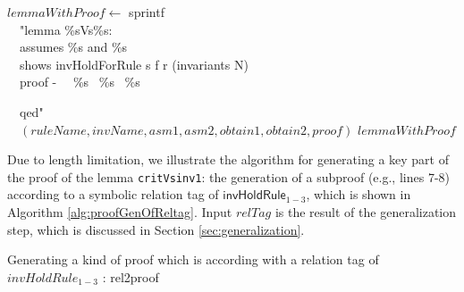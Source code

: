 \documentclass[final]{IEEEtran}
\def \twoSpaces {\ \ }
\begin{document}
{\begin{algorithm}
{$lemmaWithProof \leftarrow$ sprintf \\
\twoSpaces"lemma \%sVs\%s:\\
\twoSpaces assumes \%s and \%s\\
\twoSpaces  shows  invHoldForRule s f r (invariants   N)\\
\twoSpaces  proof -
\twoSpaces \%s~ \%s~  \%s

\twoSpaces qed"\\

\twoSpaces $(ruleName, invName, asm1,asm2, obtain1, obtain2, proof)$ \;
    \Return $lemmaWithProof$
}



\end{algorithm}




Due to length limitation, we illustrate the algorithm  for generating  a key part of the proof of the lemma {\tt critVsinv1}: the generation of a subproof (e.g., lines 7-8) according to a symbolic  relation tag of $\mathsf{invHoldRule}_{1-3}$, which is shown in Algorithm \ref{alg:proofGenOfReltag}. Input $relTag$ is the result of the   generalization step, which is discussed in Section \ref{sec:generalization}.
\begin{algorithm}
\caption{Generating a kind of proof which is according with a relation tag of $invHoldRule_{1-3}$ : rel2proof}\label{alg:proofGenOfReltag}


\end{algorithm}}
\end{document}
